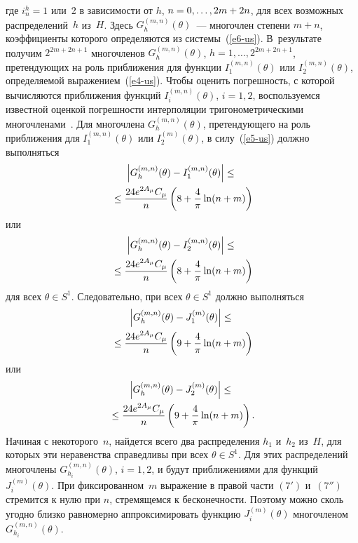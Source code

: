 \begin{multicols}{2}
\noindent
где
$i^h_n=1$ или~2 в зависимости от $h$, $n\hm=0,\ldots, 2m+2n$,
для всех возможных распределений~$h$ из~$H$. Здесь $G^{(m,n)}_h(\theta)$~--- 
многочлен степени $m+n$, коэффициенты которого определяются из системы~(\ref{e6-us}). 
В~результате получим
$2^{2m+2n+1}$ многочленов $G^{(m,n)}_h(\theta)$,
$h=1,\ldots,2^{2m+2n+1}$, претендующих на роль приближения для функции 
$I^{(m,n)}_1(\theta)$ или $I^{(m,n)}_2(\theta)$, определяемой выражением~(\ref{e4-us}). 
Чтобы оценить погрешность, с
которой вычисляются приближения функций
$I^{(m,n)}_i(\theta)$, $i=1,2$, воспользуемся известной
оценкой погрешности интерполяции тригонометрическими многочленами~\cite{11-us}.
Для многочлена $G^{(m,n)}_h(\theta)$, претендующего на роль
приближения для $I^{(m,n)}_1(\theta)$ или $I^{(m)}_2(\theta)$, в силу~(\ref{e5-us}) 
должно выполняться
\begin{multline*}
\left\vert G^{(m,n)}_h(\theta)-I^{(m,n)}_1(\theta)\right\vert\leq{}\\
{}\leq
\displaystyle\frac{\displaystyle 24e^{2A_\mu}C_\mu\mathstrut}{\displaystyle n\mathstrut}\left(8+\displaystyle\frac{\displaystyle 4\mathstrut}{\displaystyle \pi\mathstrut}\ln(n+m)\right)
\end{multline*}
или
\begin{multline*}
\left\vert G^{(m,n)}_h(\theta)-I^{(m,n)}_2(\theta)\right\vert\leq{}\\
{}\leq
\displaystyle\frac{\displaystyle 24e^{2A_\mu}C_\mu\mathstrut}{\displaystyle n\mathstrut}\left(8+\displaystyle\frac{\displaystyle 4\mathstrut}{\displaystyle \pi\mathstrut}\ln(n+m)\right)
\end{multline*}
для всех $\theta\in S^1$. Следовательно, при всех
$\theta\in S^1$ должно выполняться
\renewcommand{\theequation}{\arabic{equation}$^\prime$}
\setcounter{equation}{6}
\begin{multline}
\left\vert G^{(m,n)}_h(\theta)-J^{(m)}_1(\theta)\right\vert
\leq{}\\
{}\leq
\displaystyle\frac{\displaystyle 24e^{2A_\mu}C_\mu\mathstrut}{\displaystyle n\mathstrut}\left(9+\displaystyle\frac{\displaystyle 4\mathstrut}{\displaystyle \pi\mathstrut}\ln(n+m)\right)
\end{multline}
или
\renewcommand{\theequation}{\arabic{equation}$^{\prime\prime}$}
\setcounter{equation}{6}
\begin{multline}
\left\vert G^{(m,n)}_h(\theta)-J^{(m)}_2(\theta)\right\vert\leq{}\\
{}\leq
\displaystyle\frac{\displaystyle 24e^{2A_\mu}C_\mu\mathstrut}{\displaystyle n\mathstrut}\left(9+\displaystyle\frac{\displaystyle 4\mathstrut}{\displaystyle \pi\mathstrut}\ln(n+m)\right).
\end{multline}
Начиная с некоторого~$n$, найдется всего два распределения $h_1$ и~$h_2$
из~$H$, для которых эти неравенства справедливы при всех
$\theta\in S^1$. Для этих распределений многочлены
$G^{(m,n)}_{h_i}(\theta)$, $i=1,2$, и будут приближениями
для функций $J^{(m)}_i(\theta)$.
При фиксированном~$m$ выражение в правой части
$(7')$ и~$(7'')$ стремится к нулю при $n$, стремящемся к бесконечности.
Поэтому можно сколь угодно близко равномерно аппроксимировать
функцию $J^{(m)}_i(\theta)$ многочленом
$G^{(m,n)}_{h_i}(\theta)$.
\renewcommand{\theequation}{\arabic{equation}}
\setcounter{equation}{7}


\end{multicols}
